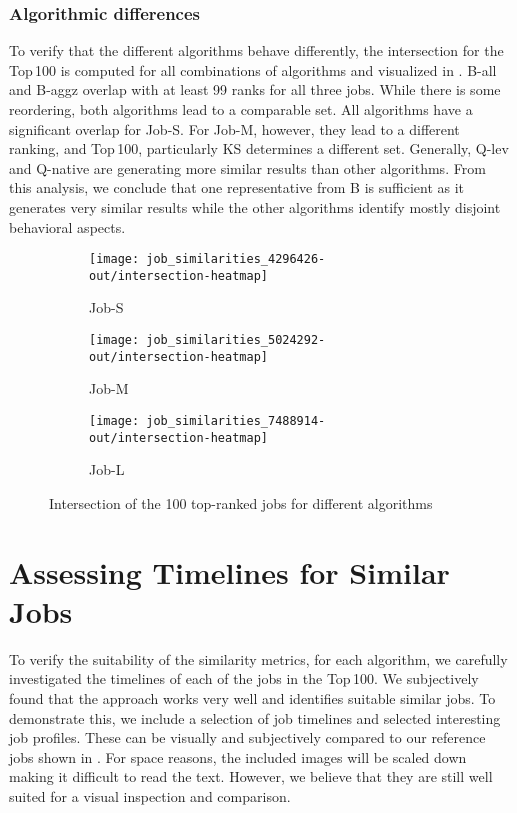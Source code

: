 \documentclass{jhps}
\begin{document}
\subsubsection{Algorithmic differences}
To verify that the different algorithms behave differently, the intersection for the Top\,100 is computed for all combinations of algorithms and visualized in .
B-all and B-aggz overlap with at least 99 ranks for all three jobs.
While there is some reordering, both algorithms lead to a comparable set.
All algorithms have a significant overlap for Job-S.
For Job-M, however, they lead to a different ranking, and Top\,100, particularly KS determines a different set.
Generally, Q-lev and Q-native are generating more similar results than other algorithms.
From this analysis, we conclude that one representative from B is sufficient as it generates very similar results while the other algorithms identify mostly disjoint behavioral aspects. %


\begin{figure}[t]
\begin{subfigure}{0.48\textwidth}
\centering
\texttt{[image: job\_similarities\_4296426-out/intersection-heatmap]}
\caption{Job-S}\label{fig:heatmap-job-S}
\end{subfigure}
\begin{subfigure}{0.48\textwidth}
\centering
\texttt{[image: job\_similarities\_5024292-out/intersection-heatmap]}
\caption{Job-M}\label{fig:heatmap-job-M} %
\end{subfigure}
\begin{subfigure}{0.52\textwidth}
\centering
\texttt{[image: job\_similarities\_7488914-out/intersection-heatmap]}
\caption{Job-L}\label{fig:heatmap-job-L}
\end{subfigure}

\centering
\caption{Intersection of the 100 top-ranked jobs for different algorithms}%
\label{fig:heatmap-job}
\end{figure}


\section{Assessing Timelines for Similar Jobs}%
\label{sec:timelines}
To verify the suitability of the similarity metrics, for each algorithm, we carefully investigated the timelines of each of the jobs in the Top\,100.
We subjectively found that the approach works very well and identifies suitable similar jobs.
To demonstrate this, we include a selection of job timelines  and selected interesting job profiles.
These can be visually and subjectively compared to our reference jobs shown in .
For space reasons, the included images will be scaled down making it difficult to read the text.
However, we believe that they are still well suited for a visual inspection and comparison.
\end{document}
